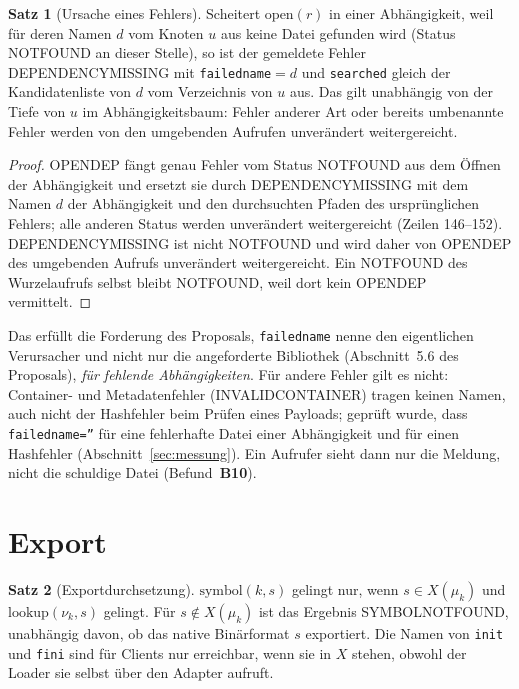 \documentclass[a4paper,12pt,twoside]{report}
\DeclareRobustCommand{\_}{\ifmmode\mbox{\textunderscore}\else\textunderscore\allowbreak{}\fi}
\theoremstyle{definition}
\newtheorem{satz}{Satz}[chapter]
\newcommand{\Bf}[1]{\textbf{B#1}}
\begin{document}
\begin{satz}[Ursache eines Fehlers]
	\label{satz:ursache}
	Scheitert $\mathrm{open}(r)$ in einer Abhängigkeit, weil für deren Namen $d$ vom Knoten $u$ aus keine Datei gefunden wird (Status NOT\_FOUND an dieser Stelle), so ist der gemeldete Fehler DEPENDENCY\_MISSING mit \texttt{failed\_name}$=d$ und \texttt{searched} gleich der Kandidatenliste von $d$ vom Verzeichnis von $u$ aus. Das gilt unabhängig von der Tiefe von $u$ im Abhängigkeitsbaum: Fehler anderer Art oder bereits umbenannte Fehler werden von den umgebenden Aufrufen unverändert weitergereicht.
\end{satz}

\begin{proof}
	OPEN\_DEP fängt genau Fehler vom Status NOT\_FOUND aus dem Öffnen der Abhängigkeit und ersetzt sie durch DEPENDENCY\_MISSING mit dem Namen $d$ der Abhängigkeit und den durchsuchten Pfaden des ursprünglichen Fehlers; alle anderen Status werden unverändert weitergereicht (Zeilen 146--152). DEPENDENCY\_MISSING ist nicht NOT\_FOUND und wird daher von OPEN\_DEP des umgebenden Aufrufs unverändert weitergereicht. Ein NOT\_FOUND des Wurzelaufrufs selbst bleibt NOT\_FOUND, weil dort kein OPEN\_DEP vermittelt.
\end{proof}

Das erfüllt die Forderung des Proposals, \texttt{failed\_name} nenne den eigentlichen Verursacher und nicht nur die angeforderte Bibliothek (Abschnitt~5.6 des Proposals), \emph{für fehlende Abhängigkeiten}. Für andere Fehler gilt es nicht: Container- und Metadatenfehler (INVALID\_CONTAINER) tragen keinen Namen, auch nicht der Hashfehler beim Prüfen eines Payloads; geprüft wurde, dass \texttt{failed\_name=''} für eine fehlerhafte Datei einer Abhängigkeit und für einen Hashfehler (Abschnitt~\ref{sec:messung}). Ein Aufrufer sieht dann nur die Meldung, nicht die schuldige Datei (Befund~\Bf{10}).

\section{Export}
\label{sec:export}

\begin{satz}[Exportdurchsetzung]
	\label{satz:export}
	$\mathrm{symbol}(k,s)$ gelingt nur, wenn $s\in X(\mu_k)$ und $\mathrm{lookup}(\nu_k,s)$ gelingt. Für $s\notin X(\mu_k)$ ist das Ergebnis SYMBOL\_NOT\_FOUND, unabhängig davon, ob das native Binärformat $s$ exportiert. Die Namen von \texttt{init} und \texttt{fini} sind für Clients nur erreichbar, wenn sie in $X$ stehen, obwohl der Loader sie selbst über den Adapter aufruft.
\end{satz}
\end{document}
